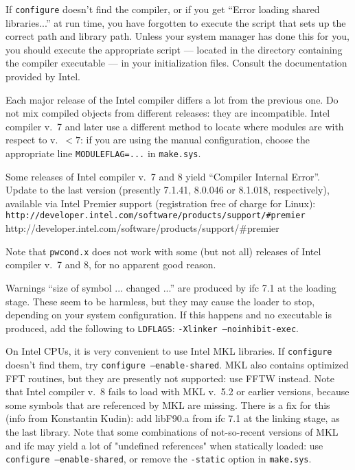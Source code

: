 \documentclass[12pt,a4paper]{article}
\begin{document}
If \texttt{configure} doesn't find the compiler, or if you get ``Error
loading shared libraries...'' at run time, you have forgotten to
execute the script that sets up the correct path and library path.
Unless your system manager has done this for you, you should execute
the appropriate script --- located in the directory containing the
compiler executable --- in your initialization files.
Consult the documentation provided by Intel. 

Each major release of the Intel compiler differs a lot from
the previous one. Do not mix compiled objects from different releases: 
they are incompatible. Intel compiler v.~7 and later use a different 
method to locate where modules are with respect to v.~$< 7$: if you
are using the manual configuration, choose the appropriate line
\texttt{MODULEFLAG=...} in \texttt{make.sys}.

Some releases of Intel compiler v.~7 and 8 yield ``Compiler Internal 
Error''.
Update to the last version (presently 7.1.41, 8.0.046 or
8.1.018, respectively), available via Intel Premier support 
(registration free of charge for Linux): 
\htmladdnormallink%
{\texttt{http://developer.intel.com/software/products/support/\#premier}}%
{http://developer.intel.com/software/products/support/\#premier}

Note that \texttt{pwcond.x} does not work with some (but not all)
releases of Intel compiler v.~7 and 8, for no apparent good reason.

Warnings ``size of symbol ... changed ...'' are produced by ifc 7.1 at
the loading stage.
These seem to be harmless, but they may cause the loader to stop,
depending on your system configuration.
If this happens and no executable is produced, add the following to
\texttt{LDFLAGS}: \texttt{-Xlinker --noinhibit-exec}.

On Intel CPUs, it is very convenient to use Intel MKL libraries.
If \texttt{configure} doesn't find them, try
\texttt{configure --enable-shared}.
MKL also contains optimized FFT routines, but they are
presently not supported: use FFTW instead. Note that Intel 
compiler v.~8 fails to load with MKL v.~5.2 or earlier versions,
because some symbols that are referenced by MKL are missing. There
is a fix for this (info from Konstantin Kudin): add libF90.a from 
ifc 7.1 at the linking stage, as the last library.
Note that some combinations of not-so-recent versions of MKL 
and ifc may yield a lot of "undefined references" when statically 
loaded: use \texttt{configure --enable-shared}, 
or remove the \texttt{-static} option in \texttt{make.sys}.
\end{document}
